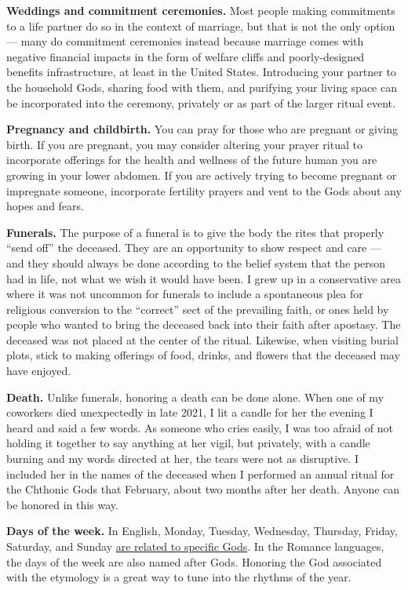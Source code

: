 \documentclass[
]{book}
\begin{document}
\textbf{Weddings and commitment ceremonies.} Most people making commitments to a life partner do so in the context of marriage, but that is not the only option --- many do commitment ceremonies instead because marriage comes with negative financial impacts in the form of welfare cliffs and poorly-designed benefits infrastructure, at least in the United States. Introducing your partner to the household Gods, sharing food with them, and purifying your living space can be incorporated into the ceremony, privately or as part of the larger ritual event.

\textbf{Pregnancy and childbirth.} You can pray for those who are pregnant or giving birth. If you are pregnant, you may consider altering your prayer ritual to incorporate offerings for the health and wellness of the future human you are growing in your lower abdomen. If you are actively trying to become pregnant or impregnate someone, incorporate fertility prayers and vent to the Gods about any hopes and fears.

\textbf{Funerals.} The purpose of a funeral is to give the body the rites that properly ``send off'' the deceased. They are an opportunity to show respect and care --- and they should always be done according to the belief system that the person had in life, not what we wish it would have been. I grew up in a conservative area where it was not uncommon for funerals to include a spontaneous plea for religious conversion to the ``correct'' sect of the prevailing faith, or ones held by people who wanted to bring the deceased back into their faith after apostasy. The deceased was not placed at the center of the ritual. Likewise, when visiting burial plots, stick to making offerings of food, drinks, and flowers that the deceased may have enjoyed.

\textbf{Death.} Unlike funerals, honoring a death can be done alone. When one of my coworkers died unexpectedly in late 2021, I lit a candle for her the evening I heard and said a few words. As someone who cries easily, I was too afraid of not holding it together to say anything at her vigil, but privately, with a candle burning and my words directed at her, the tears were not as disruptive. I included her in the names of the deceased when I performed an annual ritual for the Chthonic Gods that February, about two months after her death. Anyone can be honored in this way.

\textbf{Days of the week.} In English, Monday, Tuesday, Wednesday, Thursday, Friday, Saturday, and Sunday \href{https://www.merriam-webster.com/words-at-play/saturday-special-word-history}{are related to specific Gods}. In the Romance languages, the days of the week are also named after Gods. Honoring the God associated with the etymology is a great way to tune into the rhythms of the year.
\end{document}
